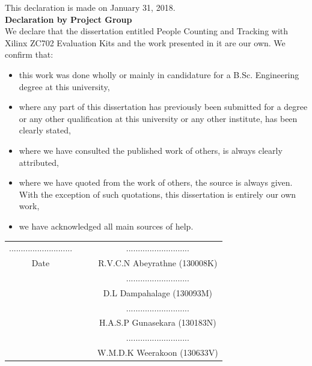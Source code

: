 \documentclass[12pt,a4paper]{report}
\begin{document}
\newpage
{}
\begin{center}
\fontsize{18pt}{12}
\end{center}
\fontsize{12pt}{12}\selectfont
This declaration is made on January 31, 2018.\\[1cm]
\textbf{Declaration by Project Group}\\
We declare that the dissertation entitled People Counting and Tracking with Xilinx ZC702 Evaluation Kits and the work presented in it are our own. We confirm that:
\begin{itemize}
\item this work was done wholly or mainly in candidature for a B.Sc. Engineering degree at this university,
\item where any part of this dissertation has previously been submitted for a degree or any other qualification at this university or any other institute, has been clearly stated,
\item where we have consulted the published work of others, is always clearly attributed,
\item where we have quoted from the work of others, the source is always given. With the exception of such quotations, this dissertation is entirely our own work,
\item we have acknowledged all main sources of help.
\end{itemize}
\vspace{1cm}
\begin{table}[h]
\begin{tabular}{cccc}
........................... &&& \hspace{5cm}...........................  \\
Date                        &&& \hspace{5cm}R.V.C.N Abeyrathne (130008K) \\[1cm]
                            &&& \hspace{5cm}...........................  \\
                            &&& \hspace{5cm}D.L Dampahalage (130093M)    \\[1cm]
                            &&& \hspace{5cm}...........................  \\
                            &&& \hspace{5cm}H.A.S.P Gunasekara (130183N) \\[1cm]
                            &&& \hspace{5cm}...........................  \\
                            &&& \hspace{5cm}W.M.D.K Weerakoon (130633V) 
\end{tabular}
\end{table}
\end{document}
